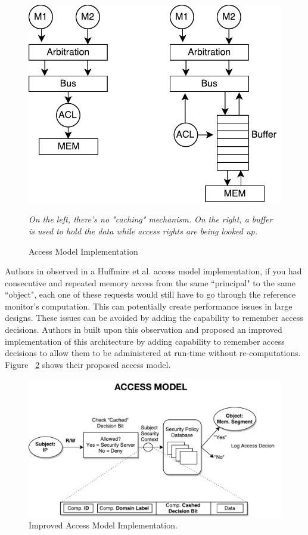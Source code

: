 \documentclass[sigconf]{acmart}
\theoremstyle{plain}
\theoremstyle{remark}
\begin{document}
\begin{figure}[hbt]
\centering
\includegraphics[width=0.75\columnwidth]{figures/ted_access.pdf}
\caption{Access Model Implementation}
\textit{On the left, there's no "caching" mechanism. On the right, a buffer is used to hold the data while access rights are being looked up.} %
\label{fig:ted}
\end{figure}



Authors in \cite{FestusFCCM} observed in a Huffmire et al. access model implementation, if you had consecutive and repeated memory access from the same ``principal" to the same ``object", each one of these requests would still have to go through the reference monitor's computation. This can potentially create performance issues in large designs. These issues can be avoided by adding the capability to remember access decisions. Authors in \cite{FestusFCCM} built upon this observation and proposed an improved implementation of this architecture by adding capability to remember access decisions to allow them to be administered at run-time without re-computations. Figure ~\ref{fig:access} shows their proposed access model.

\begin{figure}[hbt]
\centering
\includegraphics[width=1\columnwidth]{figures/access.pdf}
\caption{Improved Access Model Implementation.} %
\label{fig:access}
\end{figure}
\end{document}
